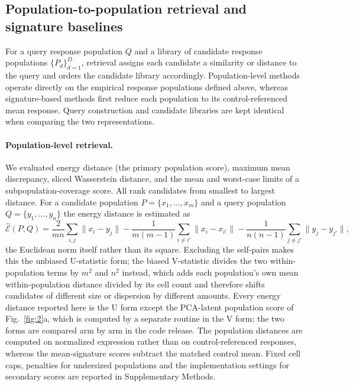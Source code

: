 \documentclass[11pt,letterpaper]{article}
\begin{document}
\subsection*{Population-to-population retrieval and signature baselines}

For a query response population $Q$ and a library of candidate response populations
$\{P_d\}_{d=1}^{D}$, retrieval assigns each candidate a similarity or distance to the
query and orders the candidate library accordingly. Population-level methods operate
directly on the empirical response populations defined above, whereas signature-based
methods first reduce each population to its control-referenced mean response. Query
construction and candidate libraries are kept identical when comparing the two
representations.

\paragraph{Population-level retrieval.}
We evaluated energy distance\cite{EnergyDistance} (the primary population score), maximum
mean discrepancy\cite{MMD}, sliced Wasserstein distance\cite{SlicedWasserstein}, and the
mean and worst-case limits of a subpopulation-coverage score. All rank candidates from
smallest to largest distance. For a candidate population $P=\{x_1,\dots,x_m\}$ and a query
population $Q=\{y_1,\dots,y_n\}$ the energy distance is estimated as
\[
\widehat{\mathcal{E}}(P,Q)
=
\frac{2}{mn}\sum_{i,j}\lVert x_i-y_j\rVert
-
\frac{1}{m(m-1)}\sum_{i\neq i'}\lVert x_i-x_{i'}\rVert
-
\frac{1}{n(n-1)}\sum_{j\neq j'}\lVert y_j-y_{j'}\rVert ,
\]
the Euclidean norm itself rather than its square. Excluding the self-pairs makes this the
unbiased U-statistic form; the biased V-statistic divides the two within-population terms by
$m^2$ and $n^2$ instead, which adds each population's own mean within-population distance
divided by its cell count and therefore shifts candidates of different size or dispersion by
different amounts. Every energy distance reported here is the U form except the PCA-latent
population score of Fig.~\ref{fig:2}a, which is computed by a separate routine in the V form;
the two forms are compared arm by arm in the code release. The population distances are computed
on normalized expression rather than on control-referenced responses, whereas the mean-signature
scores subtract the matched control mean. Fixed cell caps, penalties for undersized populations
and the implementation settings for secondary scores are reported in Supplementary Methods.
\end{document}

